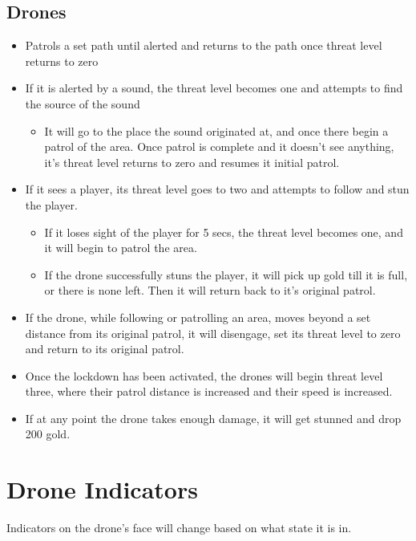 \documentclass[10pt]{report}
\begin{document}
\subsection{Drones}

\begin{itemize}
    \item Patrols a set path until alerted and returns to the path once threat level returns to zero
    \item If it is alerted by a sound, the threat level becomes one and attempts to find the source of the sound
    \begin{itemize}
        \item It will go to the place the sound originated at, and once there begin a patrol of the area. Once patrol is complete and it doesn’t see anything, it’s threat level returns to zero and resumes it initial patrol.
    \end{itemize}
    \item If it sees a player, its threat level goes to two and attempts to follow and stun the player.
    \begin{itemize}
        \item If it loses sight of the player for 5 secs, the threat level becomes one, and it will begin to patrol the area.
        \item If the drone successfully stuns the player, it will pick up gold till it is full, or there is none left. Then it will return back to it's original patrol.
    \end{itemize}
    \item If the drone, while following or patrolling an area, moves beyond a set distance from its original patrol, it will disengage, set its threat level to zero and return to its original patrol.
    \item Once the lockdown has been activated, the drones will begin threat level three, where their patrol distance is increased and their speed is increased.
    \item If at any point the drone takes enough damage, it will get stunned and drop 200 gold.    
\end{itemize}

\section{Drone Indicators}

Indicators on the drone's face will change based on what state it is in.
\end{document}
